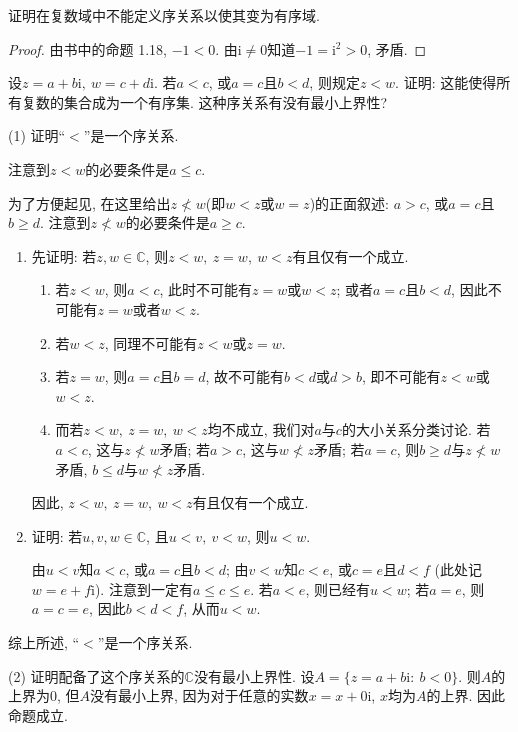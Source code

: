 \documentclass{article}
\renewcommand{\i}{\mathrm{i}}
\begin{document}
\begin{problem}[1-8]
证明在复数域中不能定义序关系以使其变为有序域.
\end{problem}

\begin{proof}
由书中的命题 1.18, $ -1<0 $. 由$ \i\neq 0 $知道$ -1=\i^2>0 $, 矛盾.
\end{proof}

\begin{problem}[1-9]
设$ z=a+b\i,\ w=c+d\i $. 若$ a<c $, 或$ a=c $且$ b<d $, 则规定$ z<w $. 证明: 这能使得所有复数的集合成为一个有序集. 这种序关系有没有最小上界性?
\end{problem}

\begin{solution}
(1) 证明“$<$”是一个序关系. \par
注意到$ z<w $的必要条件是$ a\le c $. \par
为了方便起见, 在这里给出$ z\not<w $(即$ w<z $或$ w=z $)的正面叙述: $ a>c $, 或$ a=c $且$ b\ge d $. 注意到$ z\not<w $的必要条件是$ a\ge c $. \par
\begin{enumerate}[label=(\roman*)]
\item 先证明: 若$ z,w\in\mathbb{C} $, 则$ z<w,\ z=w,\ w<z $有且仅有一个成立.\par 
\begin{enumerate}[label=\textbullet]
\item 若$ z<w $, 则$ a<c $, 此时不可能有$ z=w $或$ w<z $; 或者$ a=c $且$ b<d $, 因此不可能有$ z=w $或者$ w<z $.\par 
\item 若$ w<z $, 同理不可能有$ z<w $或$ z=w $.\par 
\item 若$ z=w $, 则$ a=c $且$ b=d $, 故不可能有$ b<d $或$ d>b $, 即不可能有$ z<w $或$ w<z $.\par 
\item 而若$ z<w,\ z=w,\ w<z $均不成立, 我们对$ a $与$ c $的大小关系分类讨论. 若$ a<c $, 这与$ z\not<w $矛盾; 若$ a>c $, 这与$ w\not<z $矛盾; 若$ a=c $, 则$ b\ge d $与$ z\not<w $矛盾, $ b\le d $与$ w\not<z $矛盾. \par
\end{enumerate}
因此, $ z<w,\ z=w,\ w<z $有且仅有一个成立.\par
\item 证明: 若$ u,v,w\in\mathbb{C} $, 且$ u<v,\ v<w $, 则$ u<w $. \par
由$ u<v $知$ a<c $, 或$ a=c $且$ b<d $; 由$ v<w $知$ c<e $, 或$ c=e $且$ d<f $ (此处记$ w=e+f\i $). 注意到一定有$ a\le c\le e $. 若$ a<e $, 则已经有$ u<w $; 若$ a=e $, 则$ a=c=e $, 因此$ b<d<f $, 从而$ u<w $.\par
\end{enumerate}\par
综上所述, “$<$”是一个序关系. \par
(2) 证明配备了这个序关系的$ \mathbb{C} $没有最小上界性. 设$ A=\{z=a+b\i:\ b<0 \} $. 则$ A $的上界为$ 0 $, 但$ A $没有最小上界, 因为对于任意的实数$ x=x+0\i $, $ x $均为$ A $的上界. 因此命题成立.
\end{solution}
\end{document}
